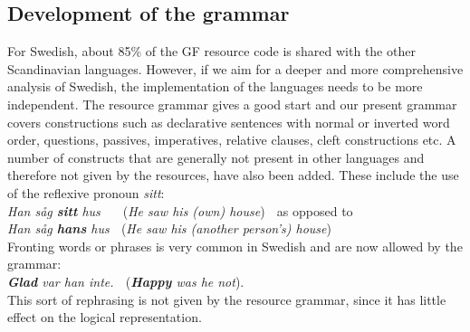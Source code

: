 \documentclass[submission]{eptcs} %
\begin{document}

\subsection{Development of the grammar}
For Swedish, about 85\% of the GF resource code is shared with the other Scandinavian
languages. %
However, if we aim for a deeper and more comprehensive analysis of Swedish,
the implementation of the languages needs to be more independent.
The resource grammar gives a good start and our present grammar 
covers constructions such as declarative sentences with normal or inverted
word order, questions, passives, imperatives, relative clauses, cleft
constructions etc.
A number of constructs that are generally not present in other languages and
therefore not given by the resources, have also been added. These include the use of
the reflexive pronoun \emph{sitt}: \\
\emph{Han såg \textbf{sitt} hus} $\; \; \; \;$ (\emph{He saw his (own) house}) $\;$
as opposed to \\
\emph{Han såg \textbf{hans} hus} $\;$ (\emph{He saw his (another person's) house}) \\
Fronting words or phrases is very common in Swedish and are now allowed by the grammar:\\
\emph{\textbf{Glad} var han inte.} $\;$ (\emph{\textbf{Happy} was he not}). \\
This sort of rephrasing is not given by the resource grammar, since it
has little effect on the logical representation.

\end{document}
